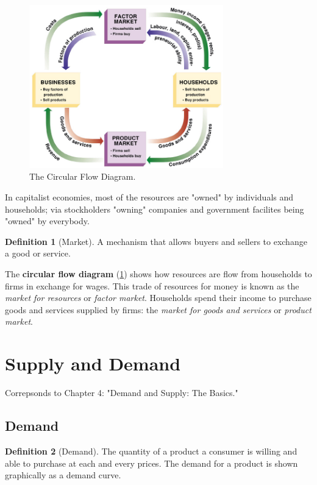 \documentclass[12pt, a4paper]{article}
\theoremstyle{definition}
\newtheorem{definition}{Definition}
\begin{document}
\begin{figure}[ht] %
    \centering
    \includegraphics[width=0.75\textwidth]{circular flow.jpg}
    \caption{The Circular Flow Diagram.}
    \label{fig:cfd}
\end{figure}
In capitalist economies, most of the resources are "owned" by individuals and households;
via stockholders "owning" companies and government facilites being "owned" by everybody.

\begin{definition}[Market]
    A mechanism that allows buyers and sellers to exchange a good or service.
\end{definition}


The \textbf{circular flow diagram} (\ref{fig:cfd}) shows how resources are flow from households to firms in exchange for wages.
This trade of resources for money is known as the \textit{market for resources} or \textit{factor market}.
Households spend their income to purchase goods and services supplied by firms: the \textit{market for goods and services} or \textit{product market}.


\newpage

\section{Supply and Demand}
Correpsonds to Chapter 4: "Demand and Supply: The Basics."

\subsection{Demand}
\begin{definition}[Demand]
    The quantity of a product a consumer is willing and able to purchase at each and every prices.
    The demand for a product is shown graphically as a demand curve.
\end{definition}
\end{document}
